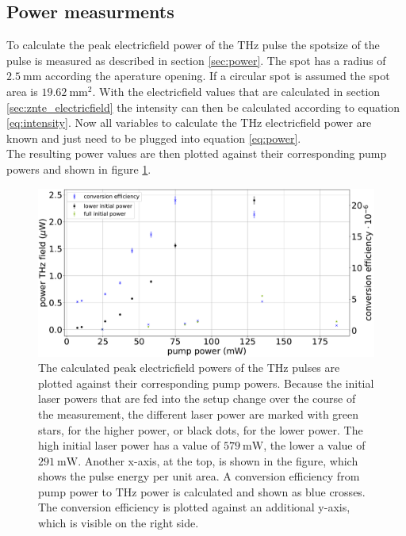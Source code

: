 \subsection{Power measurments}
\FloatBarrier
To calculate the peak electricfield power of the $\si{\tera\hertz}$ pulse the spotsize of the pulse is measured as described in section \ref{sec:power}.
The spot has a radius of $\SI{2.5}{\milli\meter}$ according the aperature opening.
If a circular spot is assumed the spot area is $\SI{19.62}{\milli\meter\squared}$.
With the electricfield values that are calculated in section \ref{sec:znte_electricfield} the intensity can then be calculated according to equation \ref{eq:intensity}.
Now all variables to calculate the $\si{\tera\hertz}$ electricfield power are known and just need to be plugged into equation \ref{eq:power}.
\\
The resulting power values are then plotted against their corresponding pump powers and shown in figure \ref{fig:znte_power}.
\begin{figure}
    \centering
    \includegraphics[width=\textwidth]{Plots/Powerznte.pdf}
    \caption{The calculated peak electricfield powers of the $\si{\tera\hertz}$ pulses are plotted against their corresponding pump powers.
    Because the initial laser powers that are fed into the setup change over the course of the measurement, the different laser power are marked with green stars, for the higher power, or black dots, for the lower power.
    The high initial laser power has a value of $\SI{579}{\milli\W}$, the lower a value of $\SI{291}{\milli\W}$.
    Another x-axis, at the top, is shown in the figure, which shows the pulse energy per unit area.
    A conversion efficiency from pump power to $\si{\tera\hertz}$ power is calculated and shown as blue crosses. 
    The conversion efficiency is plotted against an additional y-axis, which is visible on the right side.}
    \label{fig:znte_power}
\end{figure}
